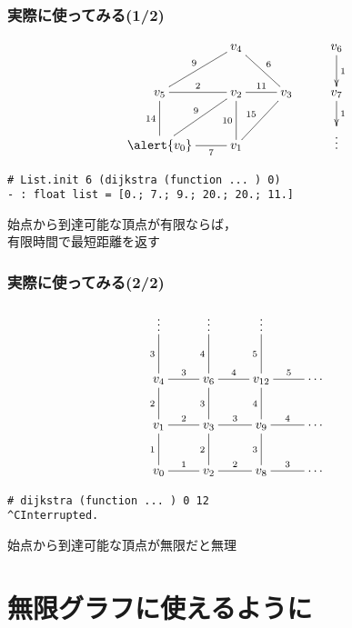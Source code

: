 \documentclass[dvipdfmx,cjk,xcolor=dvipsnames,envcountsect,notheorems,12pt]{beamer}
\theoremstyle{definition}
\begin{document}
\begin{frame}[fragile]
	\vspace{-7mm}
	\frametitle{実際に使ってみる(1/2)}
		\[\xymatrix{
			& v_{4} \ar@{-}[rd]^-{6} & & v_{6} \ar@{->}[d]^-{1} \\
			v_{5} \ar@{-}[ru]^-{9} \ar@{-}[r]^-{2} & v_{2} \ar@{-}[r]^-{11} & v_{3} & v_{7} \ar@{->}[d]^-{1} \\
			\alert{v_{0}} \ar@{-}[u]^-{14} \ar@{-}[r]_-{7} \ar@{-}[ru]^-{9} & v_{1} \ar@{-}[u]^-{10} \ar@{-}[ru]^-{15} & & \vdots \\
		} \]
	\vfill

	\begin{lstlisting}
# List.init 6 (dijkstra (function ... ) 0)
- : float list = [0.; 7.; 9.; 20.; 20.; 11.]
\end{lstlisting}
	\begin{center}
		\Large
		始点から到達可能な頂点が有限ならば，\\
		有限時間で最短距離を返す
	\end{center}
\end{frame}

\begin{frame}[fragile]
	\frametitle{実際に使ってみる(2/2)}
	\vspace{-7mm}
		\[\xymatrix{
			\vdots & \vdots & \vdots & \\
			v_{4} \ar@{-}[u]^-{3} \ar@{-}[r]^-{3} & v_{6} \ar@{-}[u]^-{4} \ar@{-}[r]^-{4} & v_{12} \ar@{-}[u]^-{5} \ar@{-}[r]^-{5} & \cdots \\
			v_{1} \ar@{-}[u]^-{2} \ar@{-}[r]^-{2} & v_{3} \ar@{-}[u]^-{3} \ar@{-}[r]^-{3} & v_{9} \ar@{-}[u]^-{4} \ar@{-}[r]^-{4} & \cdots \\
			v_{0} \ar@{-}[u]^-{1} \ar@{-}[r]^-{1} & v_{2} \ar@{-}[u]^-{2} \ar@{-}[r]^-{2} & v_{8} \ar@{-}[u]^-{3} \ar@{-}[r]^-{3} & \cdots \\
		} \]
	\vfill
	\begin{lstlisting}
# dijkstra (function ... ) 0 12
^CInterrupted.
\end{lstlisting}
	\begin{center}
		\Large
		始点から到達可能な頂点が無限だと無理
	\end{center}
\end{frame}

\section{無限グラフに使えるように}
\end{document}
